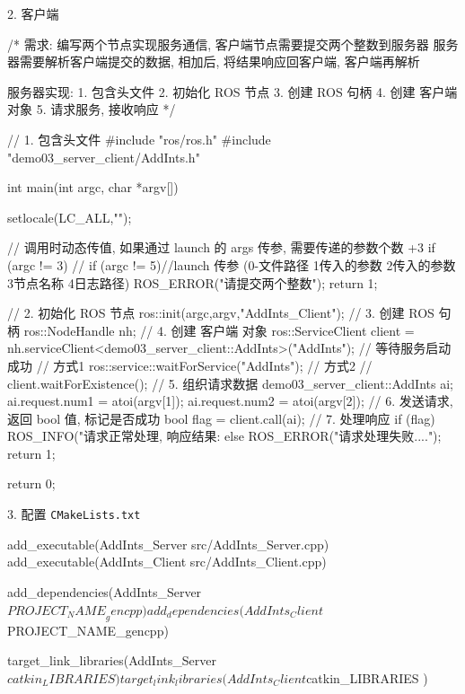 \documentclass[openany, fontset=windowsold]{ctexbook}
\theoremstyle{kaiti}
\theoremstyle{normal}
\begin{document}
2. 客户端

\begin{cpp}
  /*
      需求: 
          编写两个节点实现服务通信, 客户端节点需要提交两个整数到服务器
          服务器需要解析客户端提交的数据, 相加后, 将结果响应回客户端, 
          客户端再解析

      服务器实现:
          1. 包含头文件
          2. 初始化 ROS 节点
          3. 创建 ROS 句柄
          4. 创建 客户端 对象
          5. 请求服务, 接收响应
  */

  // 1. 包含头文件
  #include "ros/ros.h"
  #include "demo03_server_client/AddInts.h"

  int main(int argc, char *argv[])
  {
      setlocale(LC_ALL,"");

      // 调用时动态传值, 如果通过 launch 的 args 传参, 需要传递的参数个数 +3
      if (argc != 3)
      // if (argc != 5)//launch 传参 (0-文件路径 1传入的参数 2传入的参数 3节点名称 4日志路径)
      {
          ROS_ERROR("请提交两个整数");
          return 1;
      }


      // 2. 初始化 ROS 节点
      ros::init(argc,argv,"AddInts_Client");
      // 3. 创建 ROS 句柄
      ros::NodeHandle nh;
      // 4. 创建 客户端 对象
      ros::ServiceClient client = nh.serviceClient<demo03_server_client::AddInts>("AddInts");
      // 等待服务启动成功
      // 方式1
      ros::service::waitForService("AddInts");
      // 方式2
      // client.waitForExistence();
      // 5. 组织请求数据
      demo03_server_client::AddInts ai;
      ai.request.num1 = atoi(argv[1]);
      ai.request.num2 = atoi(argv[2]);
      // 6. 发送请求, 返回 bool 值, 标记是否成功
      bool flag = client.call(ai);
      // 7. 处理响应
      if (flag)
      {
          ROS_INFO("请求正常处理, 响应结果:%
      }
      else
      {
          ROS_ERROR("请求处理失败....");
          return 1;
      }

      return 0;
  }
\end{cpp}


3. 配置 \verb|CMakeLists.txt|

\begin{bash}
  add_executable(AddInts_Server src/AddInts_Server.cpp)
  add_executable(AddInts_Client src/AddInts_Client.cpp)

  add_dependencies(AddInts_Server ${PROJECT_NAME}_gencpp)
  add_dependencies(AddInts_Client ${PROJECT_NAME}_gencpp)

  target_link_libraries(AddInts_Server
    ${catkin_LIBRARIES}
  )
  target_link_libraries(AddInts_Client
    ${catkin_LIBRARIES}
  )
\end{bash}
\end{document}

